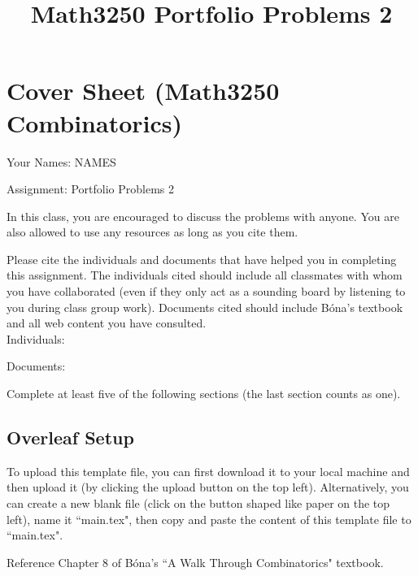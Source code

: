 \documentclass[12pt, oneside]{amsart}
\title{Math3250 Portfolio Problems 2}
\begin{document}
\section*{Cover Sheet (Math3250 Combinatorics)}
Your Names: NAMES

\vfill 

Assignment: Portfolio Problems 2

\vfill 

\bigskip
In this class, you are encouraged to discuss the problems with anyone. You are also allowed to use any resources as long as you cite them.

Please cite the individuals and documents that have helped you in completing this assignment. 
The individuals cited should include all classmates with whom you have collaborated (even if they only act as a sounding board by listening to you during class group work).
Documents cited should include B\'ona's textbook and all web content you have consulted.
\\


Individuals:

\vfill
\vfill

Documents:

\vfill
\vfill

\newpage


\maketitle


Complete at least five of the following sections (the last section counts as one).

\subsection*{Overleaf Setup}
To upload this template file, you can first download it to your local machine and then upload it (by clicking the upload button on the top left).
Alternatively, you can create a new blank file (click on the button shaped like paper on the top left), name it ``main.tex", then copy and paste the content of this template file to ``main.tex".



Reference Chapter 8 of  B\'ona's ``A Walk Through Combinatorics" textbook.

\bigskip
\end{document}

